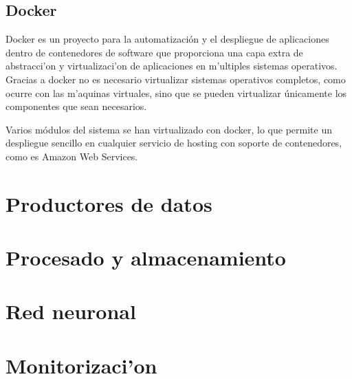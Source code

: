 \subsection{Docker}
Docker es un proyecto para la automatización y el despliegue de aplicaciones dentro de contenedores de software que proporciona una capa extra de abstracci'on y virtualizaci'on de aplicaciones en m'ultiples sistemas operativos. Gracias a docker no es necesario virtualizar sistemas operativos completos, como ocurre con las m'aquinas virtuales, sino que se pueden virtualizar únicamente los componentes que sean necesarios.

Varios módulos del sistema se han virtualizado con docker, lo que permite un despliegue sencillo en cualquier servicio de hosting con soporte de contenedores, como es Amazon Web Services.

\pagebreak

\section{Productores de datos}\label{sec:productores}



\section{Procesado y almacenamiento}\label{sec:procesado}



\section{Red neuronal}\label{sec:red}



\section{Monitorizaci'on}\label{sec:monitorizacion}

\pagebreak

